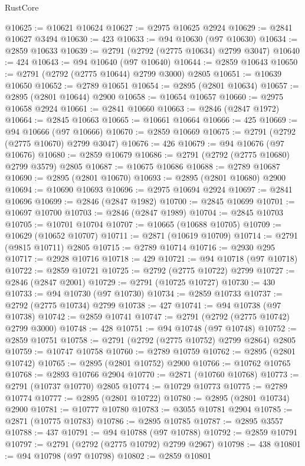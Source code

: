 \begin{lexlean}{RustCore}
\begin{coremodule}
@10625 := @10621 @10624
@10627 := @2975 @10625 @2924
@10629 := @2841 @10627 @3494
@10630 := 423
@10633 := @94 @10630 (@97 @10630)
@10634 := @2859 @10633
@10639 := @2791 (@2792 (@2775 @10634) @2799 @3047)
@10640 := 424
@10643 := @94 @10640 (@97 @10640)
@10644 := @2859 @10643
@10650 := @2791 (@2792 (@2775 @10644) @2799 @3000) @2805
@10651 := @10639 @10650
@10652 := @2789 @10651
@10654 := @2895 (@2801 @10634)
@10657 := @2895 (@2801 @10644) @2900
@10658 := @10654 @10657
@10660 := @2975 @10658 @2924
@10661 := @2841 @10660
@10663 := @2846 (@2847 @1972)
@10664 := @2845 @10663
@10665 := @10661 @10664
@10666 := 425
@10669 := @94 @10666 (@97 @10666)
@10670 := @2859 @10669
@10675 := @2791 (@2792 (@2775 @10670) @2799 @3047)
@10676 := 426
@10679 := @94 @10676 (@97 @10676)
@10680 := @2859 @10679
@10686 := @2791 (@2792 (@2775 @10680) @2799 @3579) @2805
@10687 := @10675 @10686
@10688 := @2789 @10687
@10690 := @2895 (@2801 @10670)
@10693 := @2895 (@2801 @10680) @2900
@10694 := @10690 @10693
@10696 := @2975 @10694 @2924
@10697 := @2841 @10696
@10699 := @2846 (@2847 @1982)
@10700 := @2845 @10699
@10701 := @10697 @10700
@10703 := @2846 (@2847 @1989)
@10704 := @2845 @10703
@10705 := @10701 @10704
@10707 := @10665 (@10688 @10705)
@10709 := @10629 (@10652 @10707)
@10711 := @2871 (@10619 @10709)
@10714 := @2791 (@9815 @10711) @2805
@10715 := @2789 @10714
@10716 := @2930 @295
@10717 := @2928 @10716
@10718 := 429
@10721 := @94 @10718 (@97 @10718)
@10722 := @2859 @10721
@10725 := @2792 (@2775 @10722) @2799
@10727 := @2846 (@2847 @2001)
@10729 := @2791 (@10725 @10727)
@10730 := 430
@10733 := @94 @10730 (@97 @10730)
@10734 := @2859 @10733
@10737 := @2792 (@2775 @10734) @2799
@10738 := 427
@10741 := @94 @10738 (@97 @10738)
@10742 := @2859 @10741
@10747 := @2791 (@2792 (@2775 @10742) @2799 @3000)
@10748 := 428
@10751 := @94 @10748 (@97 @10748)
@10752 := @2859 @10751
@10758 := @2791 (@2792 (@2775 @10752) @2799 @2864) @2805
@10759 := @10747 @10758
@10760 := @2789 @10759
@10762 := @2895 (@2801 @10742)
@10765 := @2895 (@2801 @10752) @2900
@10766 := @10762 @10765
@10768 := @2893 @10766 @2904
@10770 := @2871 (@10760 @10768)
@10773 := @2791 (@10737 @10770) @2805
@10774 := @10729 @10773
@10775 := @2789 @10774
@10777 := @2895 (@2801 @10722)
@10780 := @2895 (@2801 @10734) @2900
@10781 := @10777 @10780
@10783 := @3055 @10781 @2904
@10785 := @2871 (@10775 @10783)
@10786 := @2895 @10785
@10787 := @2895 @3557
@10788 := 437
@10791 := @94 @10788 (@97 @10788)
@10792 := @2859 @10791
@10797 := @2791 (@2792 (@2775 @10792) @2799 @2967)
@10798 := 438
@10801 := @94 @10798 (@97 @10798)
@10802 := @2859 @10801

\end{coremodule}
\end{lexlean}
